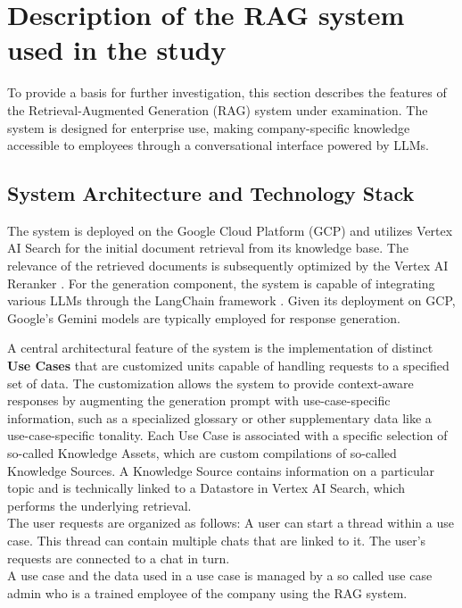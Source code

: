 \documentclass[
	english,
	ruledheaders=section,%
	class=report,%
	thesis={type=bachelor},%
	accentcolor=1b,%
	custommargins=true,%
	marginpar=false,%
	parskip=half-,%
	fontsize=11pt,%
	DIV=14,
]{tudapub}
\begin{document}
\section{Description of the RAG system used in the study}
To provide a basis for further investigation, this section describes the features of the Retrieval-Augmented Generation (RAG) system under examination. The system is designed for enterprise use, making company-specific knowledge accessible to employees through a conversational interface powered by LLMs.

\subsection{System Architecture and Technology Stack}
The system is deployed on the Google Cloud Platform (GCP) \parencite{GoogleCloudDocumentation} and utilizes Vertex AI Search \parencite{GoogleVertexAISearch} for the initial document retrieval from its knowledge base. The relevance of the retrieved documents is subsequently optimized by the Vertex AI Reranker \parencite{GoogleReranker}. For the generation component, the system is capable of integrating various LLMs through the LangChain framework \parencite{LangChain}. Given its deployment on GCP, Google's Gemini models \parencite{GoogleGemini} are typically employed for response generation.

A central architectural feature of the system is the implementation of distinct \textbf{Use Cases} that are customized units capable of handling requests to a specified set of data. The customization allows the system to provide context-aware responses by augmenting the generation prompt with use-case-specific information, such as a specialized glossary or other supplementary data like a use-case-specific tonality. Each Use Case is associated with a specific selection of so-called Knowledge Assets, which are custom compilations of so-called Knowledge Sources. A Knowledge Source contains information on a particular topic and is technically linked to a Datastore in Vertex AI Search, which performs the underlying retrieval.\\
The user requests are organized as follows: A user can start a thread within a use case. This thread can contain multiple chats that are linked to it. The user's requests are connected to a chat in turn.\\
A use case and the data used in a use case is managed by a so called use case admin who is a trained employee of the company using the RAG system.
\end{document}
